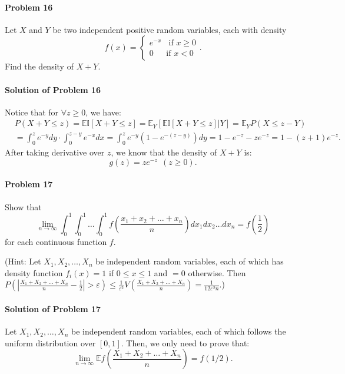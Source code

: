 \documentclass{article}
\begin{document}
\paragraph{Problem 16} Let $X$ and $Y$ be two independent positive random variables, each with density 
\[f(x)=\begin{cases}e^{-x}~~~~\mbox{if $x\geqslant 0$}\\ 0~~~~~~~\mbox{if $x < 0$}\end{cases}.\]
Find the density of $X+Y$. 

\paragraph{Solution of Problem 16} Notice that for $\forall z\geqslant 0$, we have:
\begin{equation*}
\begin{aligned}
&P(X+Y\leqslant z) =\mathbb{E}\mathbb{I}[X+Y\leqslant z] = \mathbb{E}_Y [\mathbb{E}\mathbb{I}[X+Y\leqslant z]|Y] = \mathbb{E}_Y P(X\leqslant z-Y)\\
&= \int_{0}^{z} e^{-y}dy\cdot \int_{0}^{z-y} e^{-x} dx = \int_{0}^{z} e^{-y}(1-e^{-(z-y)})dy = 1-e^{-z}-ze^{-z} = 1-(z+1)e^{-z}.
\end{aligned}    
\end{equation*}
After taking derivative over $z$, we know that the density of $X+Y$ is:
\[g(z)=ze^{-z}~~(z\geqslant 0).\]

\paragraph{Problem 17} Show that
\[\lim_{n\rightarrow\infty}\int_0^1\int_0^1\ldots\int_0^1  f\left(\frac{x_1+x_2+\ldots+x_n}{n}\right)dx_1 dx_2\ldots dx_n = f\left(\frac12\right)\]
for each continuous function $f$.

(Hint: Let $X_1, X_2,\ldots, X_n$ be independent random variables, each of which has density function $f_i(x)=1$ if $0\leqslant x\leqslant 1$ and $=0$ otherwise. Then $P\left(\left|\frac{X_1+X_2+\ldots+X_n}{n}-\frac12\right|>\varepsilon\right)\leqslant \frac{1}{\varepsilon^2}V\left(\frac{X_1+X_2+\ldots+X_n}{n}\right)=\frac{1}{12\varepsilon^2 n}$.)

\paragraph{Solution of Problem 17} Let $X_1, X_2,\ldots, X_n$ be independent random variables, each of which follows the uniform distribution over $[0,1]$. Then, we only need to prove that:
\[\lim_{n\rightarrow\infty} \mathbb{E} f\left(\frac{X_1+X_2+\ldots+X_n}{n}\right)=f(1/2).\]
\end{document}
